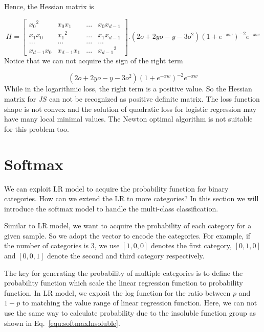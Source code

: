 \documentclass[runningheads,openany]{xhlPaper}
\begin{document}
Hence, the Hessian matrix is

\begin{displaymath}
\label{equ:lr_hessian_matrix_quadratic_loss}
H = \left[ {\begin{array}{*{20}{c}}
{{x_0}^2}&{{x_0}{x_1}}&{...}&{{x_0}{x_{d - 1}}}\\
{{x_1}{x_0}}&{{x_1}^2}&{...}&{{x_1}{x_{d - 1}}}\\
{...}&{...}&{...}&{...}\\
{{x_{d - 1}}{x_0}}&{{x_{d - 1}}{x_1}}&{...}&{{x_{d - 1}}^2}
\end{array}} \right].\left ( 2o + 2yo - y - 3o^2\right ){\left( {1 + {e^{ - xw}}} \right)^{ - 2}}{e^{ - xw}}
\end{displaymath}
Notice that we can not acquire the sign of the right term 

\begin{displaymath}
\left ( 2o + 2yo - y - 3o^2\right ){\left( {1 + {e^{ - xw}}} \right)^{ - 2}}{e^{ - xw}}
\end{displaymath}
While in the logarithmic loss, the right term is a positive value. So the Hessian matrix for $JS$ can not be recognized as positive definite matrix. The loss function shape is not convex and the solution of quadratic loss for logistic regression may have many local minimal values. The Newton optimal algorithm is not suitable for this problem too.

\section{Softmax}
We can exploit LR model to acquire the probability function for binary categories. How can we extend the LR to more categories? In this section we will introduce the softmax model to handle the multi-class classification.

Similar to LR model, we want to acquire the probability of each category for a given sample. So we adopt the vector to encode the categories. For example, if the number of categories is 3, we use $\left[1, 0, 0\right]$ denotes the first category, $\left[0, 1, 0\right]$ and $\left[0, 0, 1\right]$ denote the second and third category respectively.

The key for generating the probability of multiple categories is to define the probability function which scale the linear regression function to probability function. In LR model, we exploit the log function for the ratio between $p$ and $1 - p$ to matching the value range of linear regression function. Here, we can not use the same way to calculate probability due to the insoluble function group as shown in Eq.~\ref{equ:softmaxInsoluble}.
\end{document}
